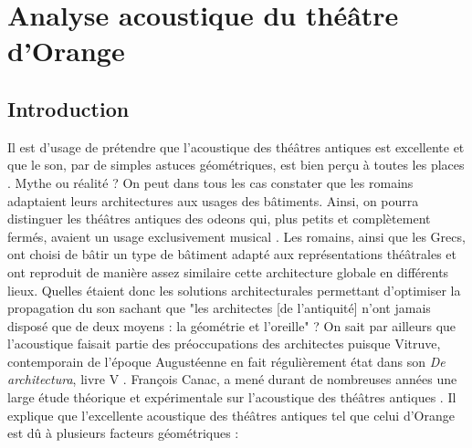\part{Analyse acoustique du théâtre d'Orange}
\label{part3}

\chapter*{Introduction}
	
 Il est d'usage de prétendre que l'acoustique des théâtres antiques est excellente et que le son, par de simples astuces géométriques, est bien perçu à toutes les places \cite[p.42]{formige}. Mythe ou réalité ? On peut dans tous les cas constater que les romains adaptaient leurs architectures aux usages des bâtiments. Ainsi, on pourra distinguer les théâtres antiques des \glspl{odeon} qui, plus petits et complètement fermés, avaient un usage exclusivement musical \cite[p.1]{roofodeon}. Les romains, ainsi que les Grecs, ont choisi de bâtir un type de bâtiment adapté aux représentations théâtrales et ont reproduit de manière assez similaire cette architecture globale en différents lieux. Quelles étaient donc les solutions architecturales permettant d'optimiser la propagation du son sachant que "les architectes [de l'antiquité] n'ont jamais disposé que de deux moyens : la géométrie et l'oreille" \cite[p.15]{canac} ? On sait par ailleurs que l'acoustique faisait partie des préoccupations des architectes puisque Vitruve, contemporain de l'époque Augustéenne en fait régulièrement état dans son \textit{De architectura}, livre V \cite[Livre V]{vitruve}. François Canac, a mené durant de nombreuses années une large étude théorique et expérimentale sur l'acoustique des théâtres antiques \cite{canac}. Il explique que l'excellente acoustique des théâtres antiques tel que celui d'Orange est dû à plusieurs facteurs géométriques :
